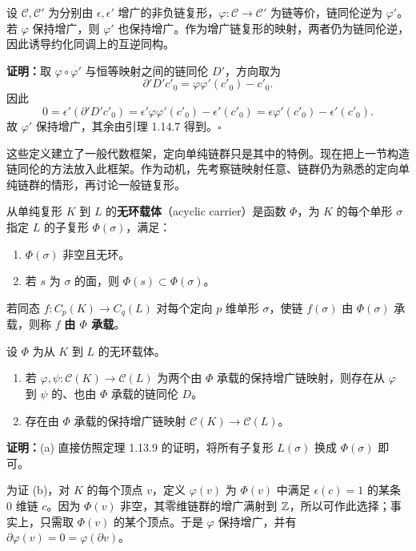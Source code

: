 设 $\mathcal C,\mathcal C'$ 为分别由 $\epsilon,\epsilon'$ 增广的非负链复形，$\varphi:\mathcal C\to\mathcal C'$ 为链等价，链同伦逆为 $\varphi'$。若 $\varphi$ 保持增广，则 $\varphi'$ 也保持增广。作为增广链复形的映射，两者仍为链同伦逆，因此诱导约化同调上的互逆同构。

\noindent\textbf{证明：}取 $\varphi\circ\varphi'$ 与恒等映射之间的链同伦 $D'$，方向取为
\[
\partial'D'c'_0=\varphi\varphi'(c'_0)-c'_0.
\]
因此
\[
0=\epsilon'(\partial'D'c'_0)=\epsilon'\varphi\varphi'(c'_0)-\epsilon'(c'_0)
=\epsilon\varphi'(c'_0)-\epsilon'(c'_0).
\]
故 $\varphi'$ 保持增广，其余由引理 1.14.7 得到。\hfill$\square$

这些定义建立了一般代数框架，定向单纯链群只是其中的特例。现在把上一节构造链同伦的方法放入此框架。作为动机，先考察链映射任意、链群仍为熟悉的定向单纯链群的情形，再讨论一般链复形。

从单纯复形 $K$ 到 $L$ 的\textbf{无环载体}（acyclic carrier）是函数 $\Phi$，为 $K$ 的每个单形 $\sigma$ 指定 $L$ 的子复形 $\Phi(\sigma)$，满足：
\begin{enumerate}[label=(\arabic*)]
\item $\Phi(\sigma)$ 非空且无环。
\item 若 $s$ 为 $\sigma$ 的面，则 $\Phi(s)\subset\Phi(\sigma)$。
\end{enumerate}
若同态 $f:C_p(K)\to C_q(L)$ 对每个定向 $p$ 维单形 $\sigma$，使链 $f(\sigma)$ 由 $\Phi(\sigma)$ 承载，则称 $f$ \textbf{由 $\Phi$ 承载}。

设 $\Phi$ 为从 $K$ 到 $L$ 的无环载体。
\begin{enumerate}[label=(\alph*)]
\item 若 $\varphi,\psi:\mathcal C(K)\to\mathcal C(L)$ 为两个由 $\Phi$ 承载的保持增广链映射，则存在从 $\varphi$ 到 $\psi$ 的、也由 $\Phi$ 承载的链同伦 $D$。
\item 存在由 $\Phi$ 承载的保持增广链映射 $\mathcal C(K)\to\mathcal C(L)$。
\end{enumerate}

\noindent\textbf{证明：}(a) 直接仿照定理 1.13.9 的证明，将所有子复形 $L(\sigma)$ 换成 $\Phi(\sigma)$ 即可。

为证 (b)，对 $K$ 的每个顶点 $v$，定义 $\varphi(v)$ 为 $\Phi(v)$ 中满足 $\epsilon(c)=1$ 的某条 $0$ 维链 $c$。因为 $\Phi(v)$ 非空，其零维链群的增广满射到 $\mathbb{Z}$，所以可作此选择；事实上，只需取 $\Phi(v)$ 的某个顶点。于是 $\varphi$ 保持增广，并有 $\partial\varphi(v)=0=\varphi(\partial v)$。

